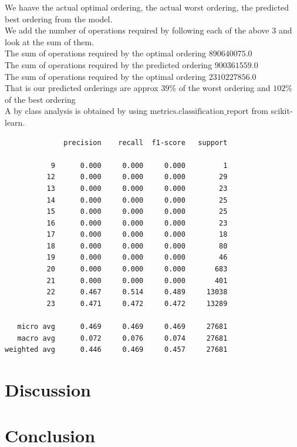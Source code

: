 We haave the actual optimal ordering, the actual worst ordering, the predicted best ordering from the model.\\
We add the number of operations required by following each of the above $3$ and look at the sum of them.\\
The sum of operations required by the optimal ordering $890640075.0$\\
The sum of operations required by the predicted ordering $900361559.0$\\
The sum of operations required by the optimal ordering $2310227856.0$\\
That is our predicted orderings are approx $39\%$ of the worst ordering and $102\%$ of the best ordering\\
A by class analysis is obtained by using $\text{metrics.classification\_report}$ from scikit-learn\cite{scikit-learn}.\\
\begin{lstlisting}
              precision    recall  f1-score   support

           9      0.000     0.000     0.000         1
          12      0.000     0.000     0.000        29
          13      0.000     0.000     0.000        23
          14      0.000     0.000     0.000        25
          15      0.000     0.000     0.000        25
          16      0.000     0.000     0.000        23
          17      0.000     0.000     0.000        18
          18      0.000     0.000     0.000        80
          19      0.000     0.000     0.000        46
          20      0.000     0.000     0.000       683
          21      0.000     0.000     0.000       401
          22      0.467     0.514     0.489     13038
          23      0.471     0.472     0.472     13289

   micro avg      0.469     0.469     0.469     27681
   macro avg      0.072     0.076     0.074     27681
weighted avg      0.446     0.469     0.457     27681
\end{lstlisting}

\section{Discussion}

\section{Conclusion}
